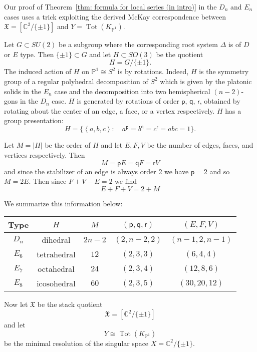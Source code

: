 \documentclass{amsart}
\theoremstyle{definition}
\newcommand{\CC} {{\mathbb C}}          %
\newcommand{\PP}{\mathbb{P}}
\newcommand{\X}{\mathfrak{X}}
\newcommand{\varp}{\mathsf{p}}
\newcommand{\varq}{\mathsf{q}}
\newcommand{\varr}{\mathsf{r}}
\begin{document}
Our proof of Theorem~\ref{thm: formula for local series (in intro)} in
the $D_{n}$ and $E_{n}$ cases uses a trick exploiting the derived
McKay correspondence between $\X =[\CC^{2}/\{\pm 1 \}]$ and
$Y=\operatorname{Tot}(K_{\PP^{1}})$. 

Let $G\subset SU(2)$ be a subgroup where the corresponding root system
$\Delta$ is of $D$ or $E$ type. Then $\{\pm 1 \}\subset G$ and let
$H\subset SO(3)$ be the quotient
\[
H=G/\{\pm 1 \}.
\]
The induced action of $H$ on $\PP^{1}\cong S^{2}$ is by
rotations. Indeed, $H$ is the symmetry group of a regular polyhedral
decomposition of $S^{2}$ which is given by the platonic solids in the
$E_{n}$ case and the decomposition into two hemispherical $(n-2)$-gons
in the $D_{n}$ case. $H$ is generated by rotations of order $\varp$,
$\varq$, $\varr$, obtained by rotating about the center of an edge, a
face, or a vertex respectively. $H$ has a group presentation:
\[
H=\{\left\langle a,b,c \right\rangle :\quad a^{\varp} = b^{\varq} =
c^{\varr} = abc=1 \}.
\]

Let $M=|H|$ be the order of $H$ and let $E,F,V$ be the number of
edges, faces, and vertices respectively. Then
\[
M=\varp E = \varq F = \varr V
\]
and since the stabilizer of an edge is always order 2 we have $\varp =2$
and so $M=2E$. Then since $F+V-E=2$ we find
\[
E+F+V = 2 + M
\]

We summarize this information below:

\begin{center}
\begin{tabular}{|c|c|c|c|c|}
\hline
Type &	$H$ &	$M$&	$(\varp ,\varq ,\varr )$ &	$(E,F,V)$\\ \hline \hline 
$D_{n}$     & dihedral & $2n-2$ & $(2,n-2,2)$& $(n-1,2,n-1)$	\\ \hline
$E_{6}$     & tetrahedral & $12$ & $(2,3,3)$& $(6,4,4)$	\\ \hline
$E_{7}$     & octahedral & $24$ & $(2,3,4)$& $(12,8,6)$	\\ \hline
$E_{8}$     & icosohedral & $60$ & $(2,3,5)$& $(30,20,12)$	\\ \hline
\end{tabular}
\end{center}

\bigskip

Now let $\X$ be the stack quotient
\[
\X=[\CC^{2}/ \{\pm 1 \}]
\]
and let
\[
Y\cong \operatorname{Tot}(K_{\PP^{1}})
\]
be the minimal resolution of the singular space $X=\CC^{2}/\{\pm 1
\}$.
\end{document}
